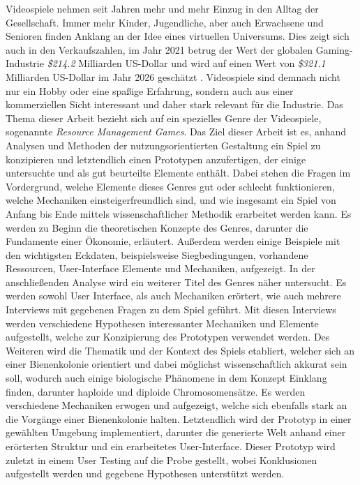 Videospiele nehmen seit Jahren mehr und mehr Einzug in den Alltag der Gesellschaft. Immer mehr Kinder, Jugendliche, aber auch Erwachsene und Senioren finden Anklang an der Idee eines virtuellen Universums. Dies zeigt sich auch in den Verkaufszahlen, im Jahr 2021 betrug der Wert der globalen Gaming-Industrie \textit{\$214.2} Milliarden US-Dollar und wird auf einen Wert von \textit{\$321.1} Milliarden US-Dollar im Jahr 2026 geschätzt \cite*[]{gamesgrowth}. Videospiele sind demnach nicht nur ein Hobby oder eine spaßige Erfahrung, sondern auch aus einer kommerziellen Sicht interessant und daher stark relevant für die Industrie. Das Thema dieser Arbeit bezieht sich auf ein spezielles Genre der Videospiele, sogenannte \textit{Resource Management Games}. Das Ziel dieser Arbeit ist es, anhand Analysen und Methoden der nutzungsorientierten Gestaltung ein Spiel zu konzipieren und letztendlich einen Prototypen anzufertigen, der einige untersuchte und als gut beurteilte Elemente enthält. Dabei stehen die Fragen im Vordergrund, welche Elemente dieses Genres gut oder schlecht funktionieren, welche Mechaniken einsteigerfreundlich sind, und wie insgesamt ein Spiel von Anfang bis Ende mittels wissenschaftlicher Methodik erarbeitet werden kann. Es werden zu Beginn die theoretischen Konzepte des Genres, darunter die Fundamente einer Ökonomie, erläutert. Außerdem werden einige Beispiele mit den wichtigsten Eckdaten, beispielsweise Siegbedingungen, vorhandene Ressourcen, User-Interface Elemente und Mechaniken, aufgezeigt. In der anschließenden Analyse wird ein weiterer Titel des Genres näher untersucht. Es werden sowohl User Interface, als auch Mechaniken erörtert, wie auch mehrere Interviews mit gegebenen Fragen zu dem Spiel geführt. Mit diesen Interviews werden verschiedene Hypothesen interessanter Mechaniken und Elemente aufgestellt, welche zur Konzipierung des Prototypen verwendet werden. Des Weiteren wird die Thematik und der Kontext des Spiels etabliert, welcher sich an einer Bienenkolonie orientiert und dabei möglichst wissenschaftlich akkurat sein soll, wodurch auch einige biologische Phänomene in dem Konzept Einklang finden, darunter haploide und diploide Chromosomensätze. Es werden verschiedene Mechaniken erwogen und aufgezeigt, welche sich ebenfalls stark an die Vorgänge einer Bienenkolonie halten. Letztendlich wird der Prototyp in einer gewählten Umgebung implementiert, darunter die generierte Welt anhand einer erörterten Struktur und ein erarbeitetes User-Interface. Dieser Prototyp wird zuletzt in einem User Testing auf die Probe gestellt, wobei Konklusionen aufgestellt werden und gegebene Hypothesen unterstützt werden.


